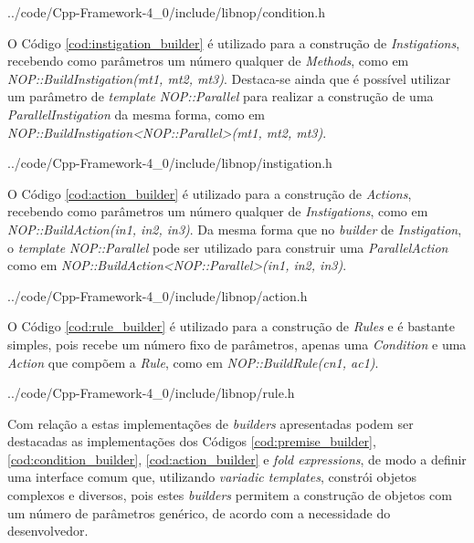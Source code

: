 
        {../code/Cpp-Framework-4_0/include/libnop/condition.h}

O Código \ref{cod:instigation_builder} é utilizado para a construção de
\textit{Instigations}, recebendo como parâmetros um número qualquer de
\textit{Methods}, como em \textit{NOP::BuildInstigation(mt1, mt2, mt3)}.
Destaca-se ainda que é possível utilizar um parâmetro de \textit{template}
\textit{NOP::Parallel} para realizar a construção de uma
\textit{ParallelInstigation} da mesma forma, como em
\textit{NOP::BuildInstigation<NOP::Parallel>(mt1, mt2, mt3)}.


            {../code/Cpp-Framework-4_0/include/libnop/instigation.h}

O Código \ref{cod:action_builder} é utilizado para a construção de
\textit{Actions}, recebendo como parâmetros um número qualquer de
\textit{Instigations}, como em \textit{NOP::BuildAction(in1, in2, in3)}. Da
mesma forma que no \textit{builder} de \textit{Instigation}, o \textit{template}
\textit{NOP::Parallel} pode ser utilizado para construir uma
\textit{ParallelAction} como em \textit{NOP::BuildAction<NOP::Parallel>(in1,
in2, in3)}.


            {../code/Cpp-Framework-4_0/include/libnop/action.h}

O Código \ref{cod:rule_builder} é utilizado para a construção de \textit{Rules}
e é bastante simples, pois recebe um número fixo de parâmetros, apenas uma
\textit{Condition} e uma \textit{Action} que compõem a \textit{Rule}, como em
\textit{NOP::BuildRule(cn1, ac1)}.


            {../code/Cpp-Framework-4_0/include/libnop/rule.h}

Com relação a estas implementações de \textit{builders} apresentadas podem ser
destacadas as implementações dos Códigos \ref{cod:premise_builder},
\ref{cod:condition_builder}, \ref{cod:action_builder} e \textit{fold
expressions}, de modo a definir uma interface comum que, utilizando
\textit{variadic templates}, constrói objetos complexos e diversos, pois estes
\textit{builders} permitem a construção de objetos com um número de parâmetros
genérico, de acordo com a necessidade do desenvolvedor.

